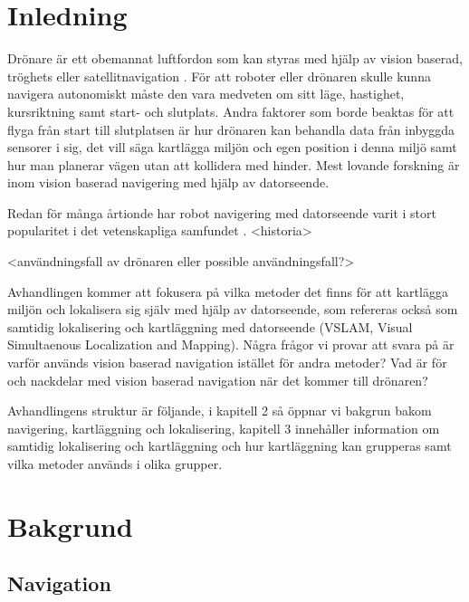 
\chapter{Inledning}

Drönare är ett obemannat luftfordon som kan styras med hjälp av vision baserad, tröghets eller satellitnavigation \citep{geospatial}. För att roboter eller drönaren skulle kunna navigera autonomiskt måste den vara medveten om sitt läge, hastighet, kursriktning samt start- och slutplats. Andra faktorer som borde beaktas för att flyga från start till slutplatsen är hur drönaren kan behandla data från inbyggda sensorer i sig, det vill säga kartlägga miljön och egen position i denna miljö samt hur man planerar vägen utan att kollidera med hinder. Mest lovande forskning är inom vision baserad navigering med hjälp av datorseende.

Redan för många årtionde har robot navigering med datorseende varit i stort popularitet i det vetenskapliga samfundet \citep{982903}. <historia>

<användningsfall av drönaren eller possible användningsfall?>

Avhandlingen kommer att fokusera på vilka metoder det finns för att kartlägga miljön och lokalisera sig själv med hjälp av datorseende, som refereras också som samtidig lokalisering och kartläggning med datorseende (VSLAM, Visual Simultaenous Localization and Mapping). Några frågor vi provar att svara på är varför används vision baserad navigation istället för andra metoder? Vad är för och nackdelar med vision baserad navigation när det kommer till drönaren?

Avhandlingens struktur är följande, i kapitell 2 så öppnar vi bakgrun bakom navigering, kartläggning och lokalisering, kapitell 3 innehåller information om samtidig lokalisering och kartläggning och hur kartläggning kan grupperas samt vilka metoder används i olika grupper. 

\chapter{Bakgrund}

\section{Navigation}

